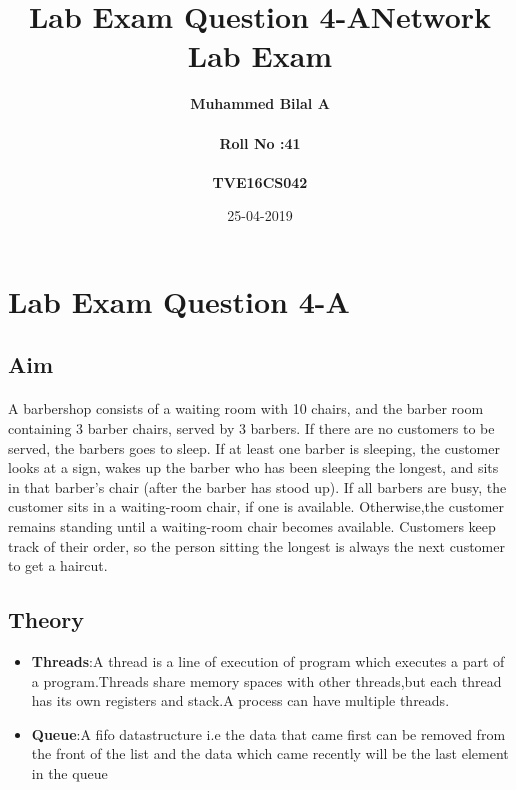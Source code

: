 \documentclass{article}
\title{Lab Exam Question 4-A}
\date{25-04-2019}
\author{\textbf{Muhammed Bilal A}\\\\ \textbf{Roll No :41} \\\\\textbf{TVE16CS042}\\}
\title{\huge \textbf{Network Lab Exam}}
\begin{document}
    \maketitle
    \newpage
    \setcounter{section}{0}
    \section{Lab Exam Question 4-A}
    \vspace{1 cm}
    \subsection{Aim}
        \paragraph{}
A barbershop consists of a waiting room with 10 chairs, and the barber room containing 3 barber chairs, served by 3 barbers. If there are no customers to be served, the barbers goes to sleep. If at least one barber is sleeping, the customer looks at a sign, wakes up the barber who has been sleeping the longest, and sits in that barber's chair (after the barber has stood up). If all barbers are busy, the customer sits in a waiting-room chair, if one is available. Otherwise,the customer remains standing until a waiting-room chair becomes available. Customers keep track of their order, so the person sitting the longest is always the next customer to get a haircut.
        \newline
    \subsection{Theory}
        \begin{itemize}
            \item \textbf{Threads}:A thread is a line of execution of program which executes a part of a program.Threads share memory spaces with other threads,but each thread has its own registers and stack.A process can have multiple threads.
            \item \textbf{Queue}:A fifo datastructure i.e the data that came first can be removed from the front of the list and the data which came recently will be the last element in the queue 
        \end{itemize}
\end{document}
